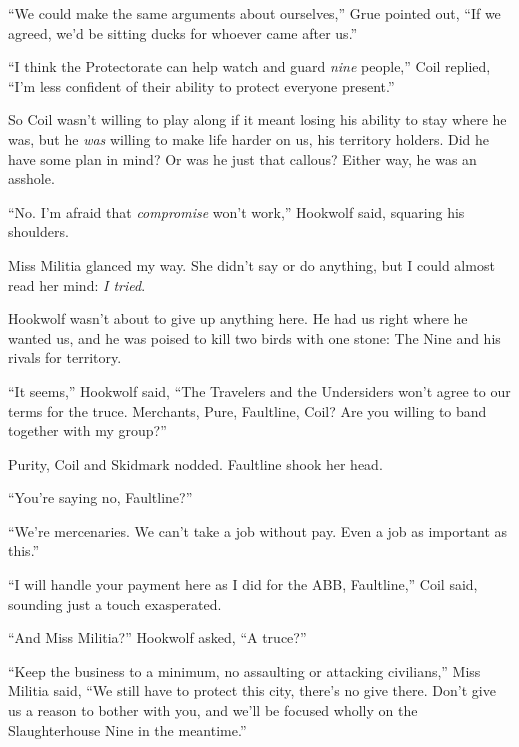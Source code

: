``We could make the same arguments about ourselves,'' Grue pointed out, ``If we agreed, we'd be sitting ducks for whoever came after us.''



``I think the Protectorate can help watch and guard \emph{nine} people,'' Coil replied, ``I'm less confident of their ability to protect everyone present.''



So Coil wasn't willing to play along if it meant losing his ability to stay where he was, but he \emph{was} willing to make life harder on us, his territory holders.  Did he have some plan in mind?  Or was he just that callous?  Either way, he was an asshole.



``No.  I'm afraid that \emph{compromise} won't work,'' Hookwolf said, squaring his shoulders.



Miss Militia glanced my way.  She didn't say or do anything, but I could almost read her mind: \emph{I tried}.



Hookwolf wasn't about to give up anything here.  He had us right where he wanted us, and he was poised to kill two birds with one stone: The Nine and his rivals for territory.



``It seems,'' Hookwolf said, ``The Travelers and the Undersiders won't agree to our terms for the truce.  Merchants, Pure, Faultline, Coil?  Are you willing to band together with my group?''



Purity, Coil and Skidmark nodded.  Faultline shook her head.



``You're saying no, Faultline?''



``We're mercenaries.  We can't take a job without pay.  Even a job as important as this.''



``I will handle your payment here as I did for the ABB, Faultline,'' Coil said, sounding just a touch exasperated.



``And Miss Militia?'' Hookwolf asked, ``A truce?''



``Keep the business to a minimum, no assaulting or attacking civilians,'' Miss Militia said, ``We still have to protect this city, there's no give there.  Don't give us a reason to bother with you, and we'll be focused wholly on the Slaughterhouse Nine in the meantime.''



